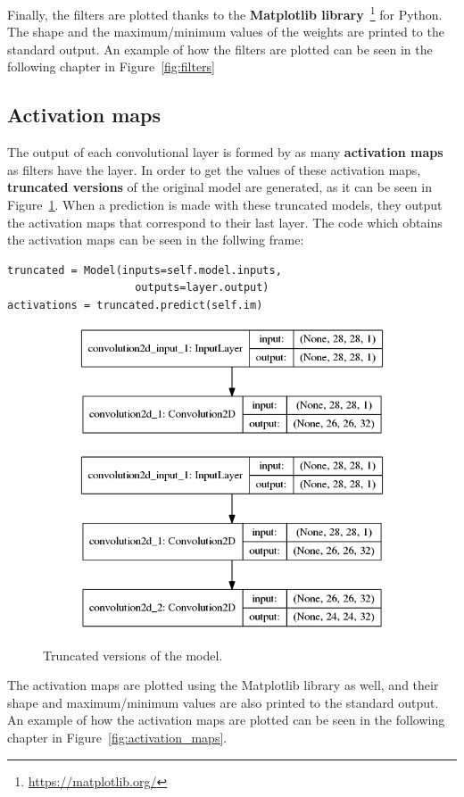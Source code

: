 Finally, the filters are plotted thanks to the \textbf{Matplotlib library}~\footnote{\url{https://matplotlib.org/}} for Python. The shape and the maximum/minimum values of the weights are printed to the standard output. An example of how the filters are plotted can be seen in the following chapter in Figure~\ref{fig:filters}

\subsection{Activation maps}
The output of each convolutional layer is formed by as many \textbf{activation maps} as filters have the layer. In order to get the values of these activation maps, \textbf{truncated versions} of the original model are generated, as it can be seen in Figure~\ref{fig:truncated}. When a prediction is made with these truncated models, they output the activation maps that correspond to their last layer. The code which obtains the activation maps can be seen in the follwing frame:
\begin{lstlisting}
truncated = Model(inputs=self.model.inputs,
                    outputs=layer.output)
activations = truncated.predict(self.im)
\end{lstlisting}

\begin{figure}
	\begin{subfigure}{0.5\textwidth}
		\centering
		\includegraphics[width=0.9\linewidth]{figures/1stconvarch.png}
		\caption{}
	\end{subfigure}
	\begin{subfigure}{0.5\textwidth}
		\centering
		\includegraphics[width=0.9\linewidth]{figures/2ndconvarch.png}
		\caption{}
	\end{subfigure}
	\caption{Truncated versions of the model.}
	\label{fig:truncated}
\end{figure}

The activation maps are plotted using the Matplotlib library as well, and their shape and maximum/minimum values are also printed to the standard output. An example of how the activation maps are plotted can be seen in the following chapter in Figure~\ref{fig:activation_maps}.
